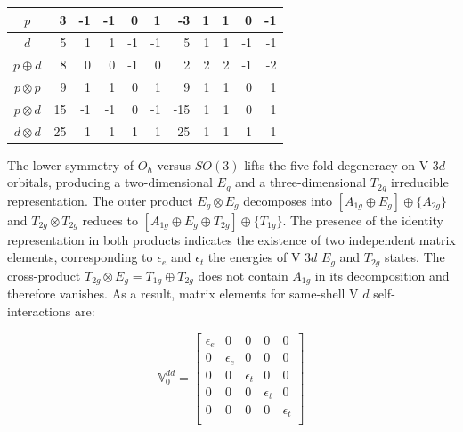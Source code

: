 \documentclass[twocolumn,showpacs,preprintnumbers,superscriptaddress,prb,floatfix,aps,10pt]{revtex4-1}
\begin{document}
\begin{table}
\begin{ruledtabular}
\begin{tabular*}{10cm}{llrrrrrrrrrr}
\multicolumn{2}{c}{$p$          } &  3  &     -1 &    -1  &     0  &     1  &  -3  &          1  &          1  &          0  &         -1  \\
\hline
\multicolumn{2}{c}{$d$          } &  5  &      1 &     1  &    -1  &    -1  &   5  &          1  &          1  &         -1  &         -1  \\
\multicolumn{2}{c}{$p \oplus  d$} &  8  &      0 &     0  &    -1  &     0  &   2  &          2  &          2  &         -1  &         -2  \\
\multicolumn{2}{c}{$p \otimes p$} &  9  &      1 &     1  &     0  &     1  &   9  &          1  &          1  &          0  &          1  \\
\multicolumn{2}{c}{$p \otimes d$} & 15  &     -1 &    -1  &     0  &    -1  & -15  &          1  &          1  &          0  &          1  \\
\multicolumn{2}{c}{$d \otimes d$} & 25  &      1 &     1  &     1  &     1  &  25  &          1  &          1  &          1  &          1  \\
\end{tabular*}
\end{ruledtabular}
\end{table}
%
The lower symmetry of $O_h$ versus $SO(3)$ lifts the five-fold degeneracy on V 3$d$ orbitals, producing a two-dimensional $E_g$ and a three-dimensional $T_{2g}$ irreducible representation. The outer product $E_g \otimes E_g$ decomposes into $[A_{1g} \oplus E_g] \oplus \{A_{2g}\}$ and $T_{2g} \otimes T_{2g}$ reduces to $[A_{1g} \oplus E_{g} \oplus T_{2g}] \oplus \{T_{1g}\}$. The presence of the identity representation in both products indicates the existence of two independent matrix elements, corresponding to $\epsilon_e$ and $\epsilon_t$ the energies of V 3$d$ $E_g$ and $T_{2g}$ states. The cross-product $T_{2g} \otimes E_g = T_{1g} \oplus T_{2g}$ does not contain $A_{1g}$ in its decomposition and therefore vanishes. As a result, matrix elements for same-shell V $d$ self-interactions are:


\begin{equation}
\label{eq:0dd}
\mathbb{V}_0^{dd} =
\begin{bmatrix}
 \epsilon_{e} & 0 & 0 & 0 & 0 \\
 0 & \epsilon_{e} & 0 & 0 & 0 \\
 0 & 0 & \epsilon_{t} & 0 & 0 \\
 0 & 0 & 0 & \epsilon_{t} & 0 \\
 0 & 0 & 0 & 0 & \epsilon_{t} \\
\end{bmatrix}
\end{equation}
\end{document}
